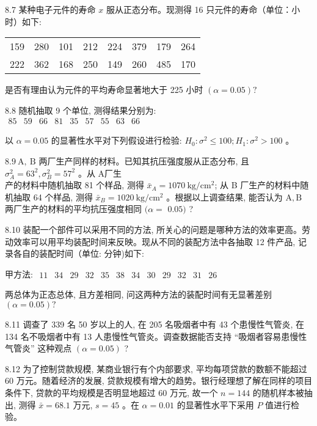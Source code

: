 \documentclass[10pt]{article}
\begin{document}
\begin{CJK*}{UTF8}{bsmi}
8.7 某种电子元件的寿命 $x$ 服从正态分布。现测得 16 只元件的寿命（单位：小时）如下:

\begin{center}
\begin{tabular}{llllllll}
159 & 280 & 101 & 212 & 224 & 379 & 179 & 264 \\
222 & 362 & 168 & 250 & 149 & 260 & 485 & 170 \\
\end{tabular}
\end{center}

是否有理由认为元件的平均寿命显著地大于 225 小时 $(\alpha=0.05) ?$

8.8 随机抽取 9 个单位, 测得结果分别为:\\
$\begin{array}{lllllllll}85 & 59 & 66 & 81 & 35 & 57 & 55 & 63 & 66\end{array}$

以 $\alpha=0.05$ 的显著性水平对下列假设进行检验: $H_{0}: \sigma^{2} \leqslant 100 ; H_{1}: \sigma^{2}>100$ 。

$8.9 \mathrm{~A}, \mathrm{~B}$ 两厂生产同样的材料。已知其抗压强度服从正态分布, 且 $\sigma_{A}^{2}=63^{2}, \sigma_{B}^{2}=57^{2}$ 。从 A厂生\\
产的材料中随机抽取 81 个样品, 测得 $\bar{x}_{A}=1070 \mathrm{~kg} / \mathrm{cm}^{2}$; 从 B 厂生产的材料中随机抽取 64 个样品, 测得 $\bar{x}_{B}=1020 \mathrm{~kg} / \mathrm{cm}^{2}$ 。根据以上调查结果, 能否认为 $\mathrm{A}, \mathrm{B}$ 两厂生产的材料的平均抗压强度相同 $(\alpha=$ $0.05)$ ?

8.10 装配一个部件可以采用不同的方法, 所关心的问题是哪种方法的效率更高。劳动效率可以用平均装配时间来反映。现从不同的装配方法中各抽取 12 件产品, 记录各自的装配时间（单位: 分钟)如下:

甲方法: $\begin{array}{llllllllllll}11 & 34 & 29 & 32 & 35 & 38 & 34 & 30 & 29 & 32 & 31 & 26\end{array}$

\begin{center}
\end{center}

两总体为正态总体, 且方差相同, 问这两种方法的装配时间有无显著差别 $(\alpha=0.05) ?$

8.11 调查了 339 名 50 岁以上的人, 在 205 名吸烟者中有 43 个患慢性气管炎, 在 134 名不吸烟者中有 13 人患慢性气管炎。调查数据能否支持 “吸烟者容易患慢性气管炎” 这种观点 $(\alpha=0.05)$ ?

8.12 为了控制贷款规模, 某商业银行有个内部要求, 平均每项贷款的数额不能超过 60 万元。随着经济的发展, 贷款规模有增大的趋势。银行经理想了解在同样的项目条件下, 贷款的平均规模是否明显地超过 60 万元, 故一个 $n=144$ 的随机样本被抽出, 测得 $\bar{x}=68.1$ 万元, $s=45$ 。在 $\alpha=0.01$ 的显著性水平下采用 $P$ 值进行检验。


\end{CJK*}
\end{document}
